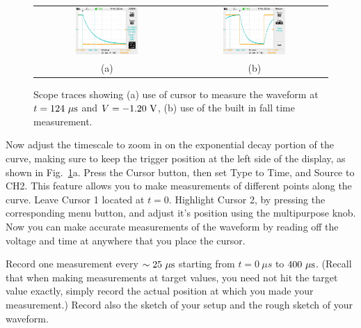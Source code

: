 \begin{figure}[htbp]
\begin{center}
\begin{tabular}{cc}
\includegraphics[width=0.45\textwidth]{figs/labs/transients/rc_cursor.jpg} &
\includegraphics[width=0.45\textwidth]{figs/labs/transients/rc_falltime.jpg} \\
(a) & (b) \\
\end{tabular}
\caption{Scope traces showing (a) use of cursor to measure the waveform at $t=124~\rm \mu s$ and $V=-1.20~\rm V$, (b) use of the built in fall time measurement.}
\label{fig:cursor_falltime}
\end{center}
\end{figure}

Now adjust the timescale to zoom in on the exponential decay portion
of the curve, making sure to keep the trigger position at the left
side of the display, as shown in Fig.~\ref{fig:cursor_falltime}a.
Press the Cursor button, then set Type to Time, and Source to CH2.
This feature allows you to make measurements of different points along
the curve.  Leave Cursor 1 located at $t=0$.  Highlight Cursor 2, by
pressing the corresponding menu button, and adjust it's position using
the multipurpose knob.  Now you can make accurate measurements of the
waveform by reading off the voltage and time at anywhere that you
place the cursor.  
\begin{measurement} Record one measurement every $\sim 25~\rm \mu s$
starting from $t=0~\mu s$ to $400~\rm \mu s$.  (Recall that when
making measurements at target values, you need not hit the target
value exactly, simply record the actual position at which you made
your measurement.) Record also the sketch of your setup and the rough sketch of your waveform.\end{measurement}

